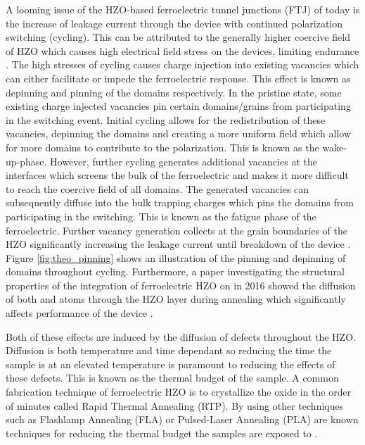 \documentclass[11pt,twoside,final]{eitExjobb}  %
\begin{document}
A looming issue of the HZO-based ferroelectric tunnel junctions (FTJ) of today
is the increase of leakage current through the device with continued
polarization switching (cycling). This can be attributed to the generally
higher coercive field of HZO which causes high electrical field stress on the
devices, limiting endurance \cite{mikolajick2020past}. The high stresses of
cycling causes charge injection into existing vacancies which can either
facilitate or impede the ferroelectric response. This effect is known as
depinning and pinning of the domains respectively. In the pristine state,
some existing charge injected vacancies pin certain domains/grains
from participating in the switching event. Initial cycling allows for
the redistribution of these vacancies, depinning the domains and creating a more
uniform field which allow for more domains to contribute to the polarization.
This is known as the wake-up-phase. However, further cycling generates
additional vacancies at the interfaces which screens the bulk of the
ferroelectric and makes it more difficult to reach the coercive field of all
domains. The generated vacancies can subsequently diffuse into the bulk
trapping charges which pins the domains from participating in the switching.
This is known as the fatigue phase of the ferroelectric. Further vacancy
generation collects at the grain boundaries of the HZO significantly increasing
the leakage current until breakdown of the device \cite{pesic2016physical}.
Figure \ref{fig:theo_pinning} shows an illustration of the pinning and
depinning of domains throughout cycling. Furthermore, a paper investigating the
structural properties of the integration of ferroelectric HZO on  in
2016 showed the diffusion of both  and  atoms through the HZO
layer during annealing which significantly affects performance of the device
\cite{kang2016structural}.

Both of these effects are induced by the diffusion of defects throughout the
HZO. Diffusion is both temperature and time dependant so reducing the time the
sample is at an elevated temperature is paramount to reducing the effects of
these defects. This is known as the thermal budget of the sample. A common
fabrication technique of ferroelectric HZO is to crystallize the oxide in the
order of minutes called Rapid Thermal Annealing (RTP). By using other
techniques such as Flashlamp Annealing (FLA) or Pulsed-Laser Annealing (PLA)
are known techniques for reducing the thermal budget the samples are exposed
to \cite{oconnor2018stabilization, grenouillet2020nanosecond, volodina2021ferroelectric}.
\end{document}
